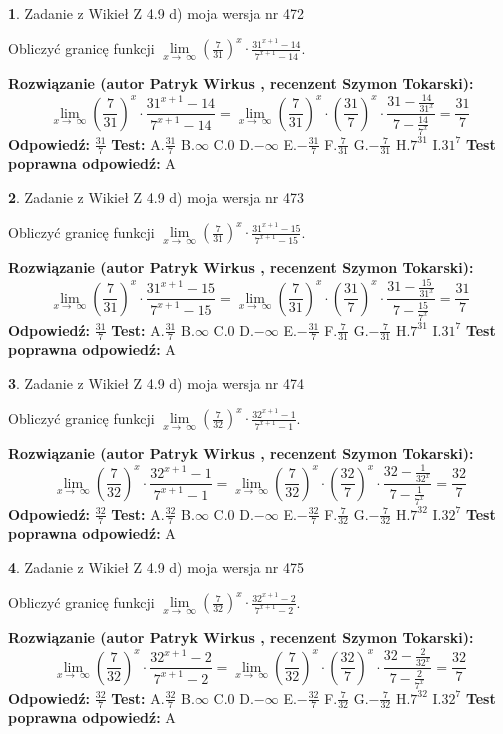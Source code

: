 \documentclass[12pt, a4paper]{article}
\theoremstyle{definition} %
\newtheorem{zad}{}
\newcommand{\zadStart}[1]{\begin{zad}#1\newline}
\newcommand{\zadStop}{\end{zad}}
\newcommand{\rozwStart}[2]{\noindent \textbf{Rozwiązanie (autor #1 , recenzent #2): }\newline}
\newcommand{\rozwStop}{\newline}
\newcommand{\odpStart}{\noindent \textbf{Odpowiedź:}\newline}
\newcommand{\odpStop}{\newline}
\newcommand{\testStart}{\noindent \textbf{Test:}\newline}
\newcommand{\testStop}{\newline}
\newcommand{\kluczStart}{\noindent \textbf{Test poprawna odpowiedź:}\newline}
\newcommand{\kluczStop}{\newline}
\begin{document}
\zadStart{Zadanie z Wikieł Z 4.9 d) moja wersja nr 472}


Obliczyć granicę funkcji  $\lim\limits_{x\to\ \infty}(\frac{7}{31})^{x}\cdot\frac{31^{x+1}-14}{7^{x+1}-14}$.
\zadStop
\rozwStart{Patryk Wirkus}{Szymon Tokarski}
$$\lim\limits_{x\to\ \infty}(\frac{7}{31})^{x}\cdot\frac{31^{x+1}-14}{7^{x+1}-14}=\lim\limits_{x\to\ \infty}(\frac{7}{31})^{x}\cdot(\frac{31}{7})^{x} \cdot \frac{31-\frac{14}{31^{x}}}{7-\frac{14}{7^{x}}} = \frac{31}{7}$$
\rozwStop
\odpStart
$\frac{31}{7}$
\odpStop
\testStart
A.$\frac{31}{7}$ B.$\infty$ C.$0$ D.$-\infty$ E.$-\frac{31}{7}$
F.$\frac{7}{31}$ G.$-\frac{7}{31}$
H.$7^{31}$
I.$31^{7}$
\testStop
\kluczStart
A
\kluczStop



\zadStart{Zadanie z Wikieł Z 4.9 d) moja wersja nr 473}


Obliczyć granicę funkcji  $\lim\limits_{x\to\ \infty}(\frac{7}{31})^{x}\cdot\frac{31^{x+1}-15}{7^{x+1}-15}$.
\zadStop
\rozwStart{Patryk Wirkus}{Szymon Tokarski}
$$\lim\limits_{x\to\ \infty}(\frac{7}{31})^{x}\cdot\frac{31^{x+1}-15}{7^{x+1}-15}=\lim\limits_{x\to\ \infty}(\frac{7}{31})^{x}\cdot(\frac{31}{7})^{x} \cdot \frac{31-\frac{15}{31^{x}}}{7-\frac{15}{7^{x}}} = \frac{31}{7}$$
\rozwStop
\odpStart
$\frac{31}{7}$
\odpStop
\testStart
A.$\frac{31}{7}$ B.$\infty$ C.$0$ D.$-\infty$ E.$-\frac{31}{7}$
F.$\frac{7}{31}$ G.$-\frac{7}{31}$
H.$7^{31}$
I.$31^{7}$
\testStop
\kluczStart
A
\kluczStop



\zadStart{Zadanie z Wikieł Z 4.9 d) moja wersja nr 474}


Obliczyć granicę funkcji  $\lim\limits_{x\to\ \infty}(\frac{7}{32})^{x}\cdot\frac{32^{x+1}-1}{7^{x+1}-1}$.
\zadStop
\rozwStart{Patryk Wirkus}{Szymon Tokarski}
$$\lim\limits_{x\to\ \infty}(\frac{7}{32})^{x}\cdot\frac{32^{x+1}-1}{7^{x+1}-1}=\lim\limits_{x\to\ \infty}(\frac{7}{32})^{x}\cdot(\frac{32}{7})^{x} \cdot \frac{32-\frac{1}{32^{x}}}{7-\frac{1}{7^{x}}} = \frac{32}{7}$$
\rozwStop
\odpStart
$\frac{32}{7}$
\odpStop
\testStart
A.$\frac{32}{7}$ B.$\infty$ C.$0$ D.$-\infty$ E.$-\frac{32}{7}$
F.$\frac{7}{32}$ G.$-\frac{7}{32}$
H.$7^{32}$
I.$32^{7}$
\testStop
\kluczStart
A
\kluczStop



\zadStart{Zadanie z Wikieł Z 4.9 d) moja wersja nr 475}


Obliczyć granicę funkcji  $\lim\limits_{x\to\ \infty}(\frac{7}{32})^{x}\cdot\frac{32^{x+1}-2}{7^{x+1}-2}$.
\zadStop
\rozwStart{Patryk Wirkus}{Szymon Tokarski}
$$\lim\limits_{x\to\ \infty}(\frac{7}{32})^{x}\cdot\frac{32^{x+1}-2}{7^{x+1}-2}=\lim\limits_{x\to\ \infty}(\frac{7}{32})^{x}\cdot(\frac{32}{7})^{x} \cdot \frac{32-\frac{2}{32^{x}}}{7-\frac{2}{7^{x}}} = \frac{32}{7}$$
\rozwStop
\odpStart
$\frac{32}{7}$
\odpStop
\testStart
A.$\frac{32}{7}$ B.$\infty$ C.$0$ D.$-\infty$ E.$-\frac{32}{7}$
F.$\frac{7}{32}$ G.$-\frac{7}{32}$
H.$7^{32}$
I.$32^{7}$
\testStop
\kluczStart
A
\kluczStop
\end{document}
